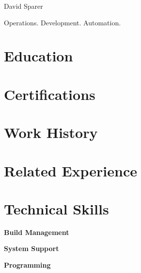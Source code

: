 \documentclass{cls/res}
\begin{document}
	\thispagestyle{empty} %

	\begin{resume}
		\vspace{-0.5in}
		\begin{minipage}[c]{0.78\textwidth}
			\centerline{{\Huge David Sparer}}
			\vspace{.2in}
			\centerline{Operations. Development. Automation.}
		\end{minipage}
		\begin{minipage}[c]{0.25\textwidth}
			
		\end{minipage}

		\section{Education}
			\vspace{0.1in}
			

		\section{Certifications}
			\vspace{0.1in}
			

		\section{Work History}
			\vspace{0.1in}
			
			
			
			
			
			

		\section{Related Experience}
			\vspace{0.1in}
			

		\section{Technical Skills}
			\vspace{0.1in}
			{\bf Build Management}
				\vspace{-0.1in}
				
			\vspace{-0.1in}
			{\bf System Support}
				\vspace{-0.1in}
				
			\vspace{-0.1in}
			{\bf Programming}
				\vspace{-0.1in}
				

	\end{resume}
\end{document}
